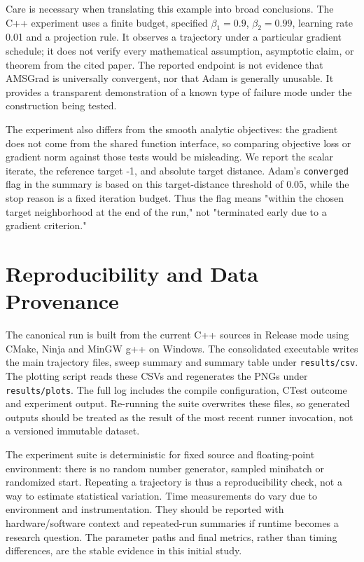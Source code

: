 \documentclass[conference]{IEEEtran}
\begin{document}
Care is necessary when translating this example into broad conclusions. The C++ experiment uses a finite budget, specified $\beta_1=0.9$, $\beta_2=0.99$, learning rate 0.01 and a projection rule. It observes a trajectory under a particular gradient schedule; it does not verify every mathematical assumption, asymptotic claim, or theorem from the cited paper. The reported endpoint is not evidence that AMSGrad is universally convergent, nor that Adam is generally unusable. It provides a transparent demonstration of a known type of failure mode under the construction being tested.

The experiment also differs from the smooth analytic objectives: the gradient does not come from the shared function interface, so comparing objective loss or gradient norm against those tests would be misleading. We report the scalar iterate, the reference target -1, and absolute target distance. Adam's \texttt{converged} flag in the summary is based on this target-distance threshold of 0.05, while the stop reason is a fixed iteration budget. Thus the flag means "within the chosen target neighborhood at the end of the run," not "terminated early due to a gradient criterion."
\section{Reproducibility and Data Provenance}
The canonical run is built from the current C++ sources in Release mode using CMake, Ninja and MinGW g++ on Windows. The consolidated executable writes the main trajectory files, sweep summary and summary table under \texttt{results/csv}. The plotting script reads these CSVs and regenerates the PNGs under \texttt{results/plots}. The full log includes the compile configuration, CTest outcome and experiment output. Re-running the suite overwrites these files, so generated outputs should be treated as the result of the most recent runner invocation, not a versioned immutable dataset.

The experiment suite is deterministic for fixed source and floating-point environment: there is no random number generator, sampled minibatch or randomized start. Repeating a trajectory is thus a reproducibility check, not a way to estimate statistical variation. Time measurements do vary due to environment and instrumentation. They should be reported with hardware/software context and repeated-run summaries if runtime becomes a research question. The parameter paths and final metrics, rather than timing differences, are the stable evidence in this initial study.
\end{document}
